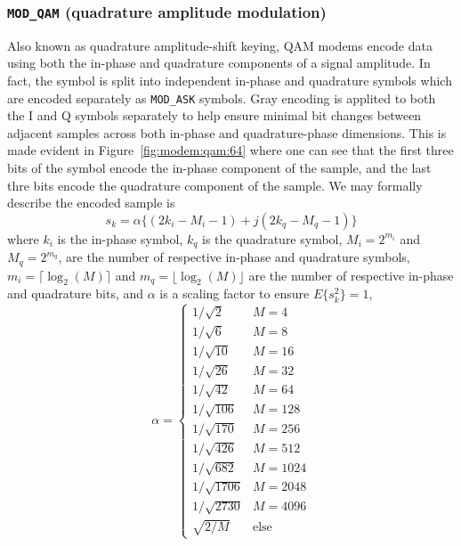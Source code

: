 \subsubsection{{\tt MOD\_QAM} (quadrature amplitude modulation)}
Also known as quadrature amplitude-shift keying, QAM modems encode data using
both the in-phase and quadrature components of a signal amplitude.
In fact, the symbol is split into independent in-phase and quadrature symbols
which are encoded separately as {\tt MOD\_ASK} symbols.
Gray encoding is applited to both the I and Q symbols separately to help
ensure minimal bit changes between adjacent samples across both in-phase and
quadrature-phase dimensions.
This is made evident in Figure~\ref{fig:modem:qam:64} where one can see that
the first three bits of the symbol encode the in-phase component of the
sample, and the last thre bits encode the quadrature component of the sample.
%
We may formally describe the encoded sample is
\[
    s_k = \alpha \{ ( 2 k_i - M_i - 1 ) + j(2 k_q - M_q - 1) \}
\]
where
$k_i$ is the in-phase symbol,
$k_q$ is the quadrature symbol,
$M_i = 2^{m_i}$ and $M_q = 2^{m_q}$, are the number of respective in-phase and
quadrature symbols,
$m_i=\lceil \log_2(M) \rceil$ and $m_q=\lfloor \log_2(M) \rfloor$ are the
number of respective in-phase and quadrature bits, and
$\alpha$ is a scaling factor to ensure $E\{s_k^2\}=1$,
\[
    \alpha = 
    \begin{cases}
    1/\sqrt{2}      &   M=4     \\
    1/\sqrt{6}      &   M=8     \\
    1/\sqrt{10}     &   M=16    \\
    1/\sqrt{26}     &   M=32    \\
    1/\sqrt{42}     &   M=64    \\
    1/\sqrt{106}    &   M=128   \\
    1/\sqrt{170}    &   M=256   \\
    1/\sqrt{426}    &   M=512   \\
    1/\sqrt{682}    &   M=1024  \\
    1/\sqrt{1706}   &   M=2048  \\
    1/\sqrt{2730}   &   M=4096  \\
    \sqrt{2/M}      &   \text{else}
    \end{cases}
\]


